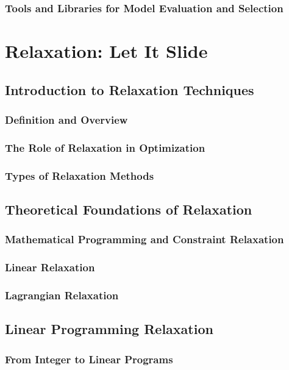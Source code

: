 \documentclass[12pt]{book} %
\begin{document}
\subsection{Tools and Libraries for Model Evaluation and Selection}

\chapter{Relaxation: Let It Slide}

\section{Introduction to Relaxation Techniques}
\subsection{Definition and Overview}
\subsection{The Role of Relaxation in Optimization}
\subsection{Types of Relaxation Methods}

\section{Theoretical Foundations of Relaxation}
\subsection{Mathematical Programming and Constraint Relaxation}
\subsection{Linear Relaxation}
\subsection{Lagrangian Relaxation}

\section{Linear Programming Relaxation}
\subsection{From Integer to Linear Programs}
\end{document}
